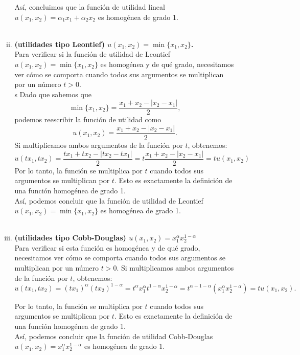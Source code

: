 \begin{enumerate}
\begin{enumerate}[\bfseries a)]
\begin{enumerate}[i)]
		    Así, concluimos que la función de utilidad lineal $u(x_1,x_2)=\alpha_1x_1+\alpha_2x_2$ es homogénea de grado 1.\\\\


		\item \textbf{\boldmath (utilidades tipo Leontief) $u(x_1,x_2)=\min\{x_1, x_2\}$.}\\

		    Para verificar si la función de utilidad de Leontief $u(x_1,x_2)=\min\{x_1, x_2\}$ es homogénea y de qué grado, necesitamos ver cómo se comporta cuando todos sus argumentos se multiplican por un número $t > 0$.\\ 
s
		    Dado que sabemos que 
		    $$\min\{x_1, x_2\}=\dfrac{x_1+x_2-|x_2-x_1|}{2},$$ 
		    podemos reescribir la función de utilidad como 
		    $$u(x_1,x_2)=\dfrac{x_1+x_2-|x_2-x_1|}{2}.$$
		    Si multiplicamos ambos argumentos de la función por $t$, obtenemos:
		    $$u(tx_1, tx_2) = \dfrac{tx_1+tx_2-|tx_2-tx_1|}{2} = t\dfrac{x_1+x_2-|x_2-x_1|}{2} = tu(x_1, x_2)$$
		    Por lo tanto, la función se multiplica por $t$ cuando todos sus argumentos se multiplican por $t$. Esto es exactamente la definición de una función homogénea de grado 1.\\

		    Así, podemos concluir que la función de utilidad de Leontief $u(x_1,x_2)=\min\{x_1, x_2\}$ es homogénea de grado 1. \\\\

		\item \textbf{\boldmath (utilidades tipo Cobb-Douglas) $u(x_1,x_2)=x_1^{\alpha}x_2^{1-\alpha}$}\\

		    Para verificar si esta función es homogénea y de qué grado, necesitamos ver cómo se comporta cuando todos sus argumentos se multiplican por un número $t > 0$. Si multiplicamos ambos argumentos de la función por $t$, obtenemos:
		    $$u(tx_1, tx_2) = (tx_1)^{\alpha}(tx_2)^{1-\alpha} = t^{\alpha}x_1^{\alpha}t^{1-\alpha}x_2^{1-\alpha} = t^{\alpha + 1 - \alpha}(x_1^{\alpha}x_2^{1-\alpha}) = tu(x_1, x_2).$$

		    Por lo tanto, la función se multiplica por $t$ cuando todos sus argumentos se multiplican por $t$. Esto es exactamente la definición de una función homogénea de grado 1.\\

		    Así, podemos concluir que la función de utilidad Cobb-Douglas $u(x_1,x_2)=x_1^{\alpha}x_2^{1-\alpha}$ es homogénea de grado 1. \\\\


\end{enumerate}
\end{enumerate}
\end{enumerate}
